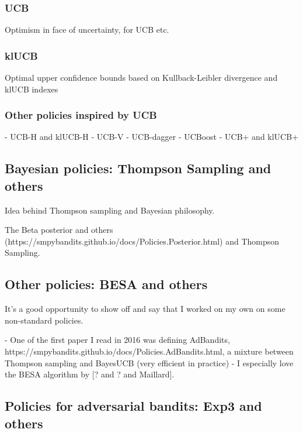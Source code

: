 \subsubsection{UCB}
Optimism in face of uncertainty, for UCB etc.


\subsubsection{klUCB}
Optimal upper confidence bounds based on Kullback-Leibler divergence and klUCB indexes

\subsubsection{Other policies inspired by UCB}

- UCB-H and klUCB-H
- UCB-V
- UCB-dagger
- UCBoost
- UCB+ and klUCB+


\subsection{Bayesian policies: Thompson Sampling and others}

Idea behind Thompson sampling and Bayesian philosophy.

The Beta posterior and others (https://smpybandits.github.io/docs/Policies.Posterior.html) and Thompson Sampling.


\subsection{Other policies: BESA and others}

It's a good opportunity to show off and say that I worked on my own on some non-standard policies.

- One of the first paper I read in 2016 was defining AdBandits, https://smpybandits.github.io/docs/Policies.AdBandits.html, a mixture between Thompson sampling and BayesUCB (very efficient in practice)
- I especially love the BESA algorithm by [? and ? and Maillard].


\subsection{Policies for adversarial bandits: Exp3 and others}

